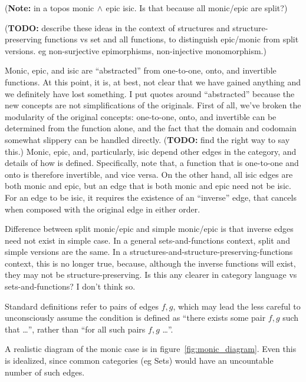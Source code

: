 \documentclass[11pt]{book}
\begin{document}
(\textbf{Note:} in a topos monic$\,\wedge\,$epic \implies isic.
Is that because all monic/epic are split?)

(\textbf{TODO:} describe these ideas in the context of
structures and structure-preserving functions vs
set and all functions, to distinguish epic/monic from split versions.
eg non-surjective epimorphisms, non-injective monomorphism.)

Monic, epic, and isic are ``abstracted'' 
from one-to-one, onto, and invertible functions.
At this point, it is, at best, not clear that we have gained
anything and we definitely have lost something.
I put quotes around ``abstracted'' because the new concepts are
not simplifications of the originals.
First of all, 
we've broken the modularity of the original concepts:
one-to-one, onto, and invertible can be determined from
the function alone, and the fact that the domain and codomain
somewhat slippery can be handled directly.
(\textbf{TODO:} find the right way to say this.)
Monic, epic, and, particularly, isic depend other edges in the category, 
and details of how \compose is defined.
Specifically, note that,
a function that is one-to-one and onto is
therefore invertible, and vice versa.
On the other hand, all isic edges are both monic and epic,
but an edge that is both monic and epic need not be isic.
For an edge to be isic, it requires the existence of an ``inverse''
edge, that cancels when composed with the original edge 
in either order.

Difference between split monic/epic and simple monic/epic
is that inverse edges need not exist in simple case.
In a general sets-and-functions context, split and simple versions
are the same.
In a structures-and-structure-preserving-functions context,
this is no longer true, because, although the inverse functions
will exist, they may not be structure-preserving.
Is this any clearer in category language vs sets-and-functions?
I don't think so.


Standard definitions refer to pairs of edges $f, g$,
which may lead the less careful to unconsciously assume
the condition is defined as 
``there exists some pair $f,g$ such that \ldots'',
rather than
``for all such pairs $f,g$ \ldots''.

A realistic diagram of the monic case 
is in figure~\ref{fig:monic_diagram}.
Even this is idealized, since common categories (eg Sets)
would have an uncountable number of such edges.
\end{document}
